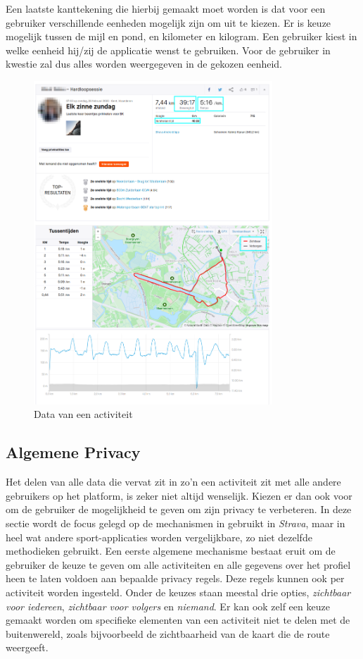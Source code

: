 Een laatste kanttekening die hierbij gemaakt moet worden is dat voor een
gebruiker verschillende eenheden mogelijk zijn om uit te kiezen. Er is keuze
mogelijk tussen de mijl en pond, en kilometer en kilogram. Een gebruiker kiest
in welke eenheid hij/zij de applicatie wenst te gebruiken. Voor de gebruiker in
kwestie zal dus alles worden weergegeven in de gekozen eenheid.
\begin{figure}
    \centering
    \includegraphics[width=0.8\textwidth]{fig/VoorbeeldActiviteit_Personal.png}
    \caption{Data van een activiteit}\label{fig:activityData}
\end{figure}

\subsection{Algemene Privacy}\label{Algemene Privacy}
Het delen van alle data die vervat zit in zo'n een activiteit zit met alle
andere gebruikers op het platform, is zeker niet altijd wenselijk. Kiezen er
dan ook voor om de gebruiker de mogelijkheid te geven om zijn privacy te
verbeteren. In deze sectie wordt de focus gelegd op de mechanismen in gebruikt
in \textit{Strava}, maar in heel wat andere sport-applicaties worden
vergelijkbare, zo niet dezelfde methodieken gebruikt. Een eerste algemene
mechanisme bestaat eruit om de gebruiker de keuze te geven om alle activiteiten
en alle gegevens over het profiel heen te laten voldoen aan bepaalde privacy
regels. Deze regels kunnen ook per activiteit worden ingesteld. Onder de keuzes
staan meestal drie opties, \textit{zichtbaar voor iedereen}, \textit{zichtbaar
    voor volgers} en \textit{niemand}. Er kan ook zelf een keuze gemaakt worden om
specifieke elementen van een activiteit niet te delen met de buitenwereld,
zoals bijvoorbeeld de zichtbaarheid van de kaart die de route
weergeeft.\cite{Activity24:online}

